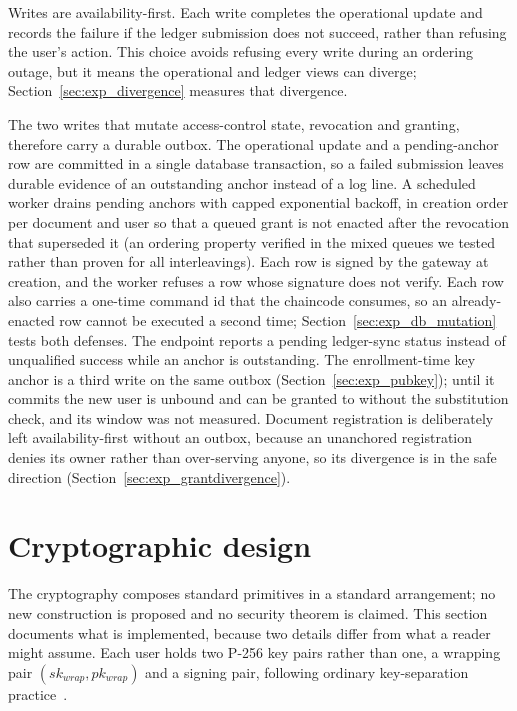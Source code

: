 \documentclass[preprint,12pt]{elsarticle}
\begin{document}
Writes are availability-first. Each write completes the operational update and
records the failure if the ledger submission does not succeed, rather than
refusing the user's action. This choice avoids refusing every write during an
ordering outage, but it means the operational and ledger views can diverge;
Section~\ref{sec:exp_divergence} measures that divergence.

The two writes that mutate access-control state, revocation and granting,
therefore carry a durable outbox. The operational update and a pending-anchor
row are committed in a single database transaction, so a failed submission
leaves durable evidence of an outstanding anchor instead of a log line. A
scheduled worker drains pending anchors with capped exponential backoff, in
creation order per document and user so that a queued grant is not enacted
after the revocation that superseded it (an ordering property verified in the
mixed queues we tested rather than proven for all interleavings). Each row is
signed by the gateway at creation, and the worker refuses a row whose signature
does not verify. Each row also carries a one-time command id that the
chaincode consumes, so an already-enacted row cannot be executed a second time;
Section~\ref{sec:exp_db_mutation} tests both defenses. The endpoint reports a
pending ledger-sync status instead of unqualified success while an anchor is
outstanding. The enrollment-time key anchor is a third write on the same
outbox (Section~\ref{sec:exp_pubkey}); until it commits the new user is
unbound and can be granted to without the substitution check, and its window
was not measured. Document
registration is deliberately left availability-first without an outbox, because
an unanchored registration denies its owner rather than over-serving anyone,
so its divergence is in the safe direction
(Section~\ref{sec:exp_grantdivergence}).


\section{Cryptographic design}
\label{sec:crypto}

The cryptography composes standard primitives in a standard arrangement; no
new construction is proposed and no security theorem is claimed. This section
documents what is implemented, because two details differ from what a reader
might assume. Each user holds two
P-256 key pairs rather than one, a wrapping pair $(sk_{wrap}, pk_{wrap})$ and a
signing pair, following ordinary key-separation
practice~\cite{nist80057p1}.
\end{document}
